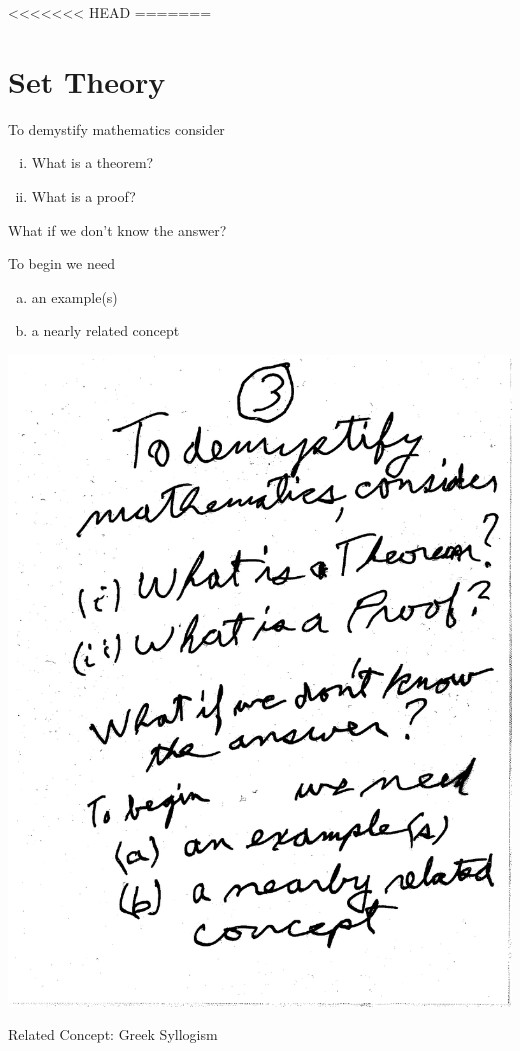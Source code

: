 \documentclass[10pt,a4paper]{article}
\begin{document}
<<<<<<< HEAD
=======

\section{Set Theory}
To demystify mathematics consider
\begin{enumerate}[(i)]
\item What is a theorem?
\item What is a proof?
\end{enumerate}
What if we don't know the answer?

To begin we need
\begin{enumerate}[(a)]
\item an example(s)
\item a nearly related concept
\end{enumerate}


\includegraphics[scale=.5]{Pages/ST_3}

\newpage

Related Concept: Greek Syllogism
\end{document}
